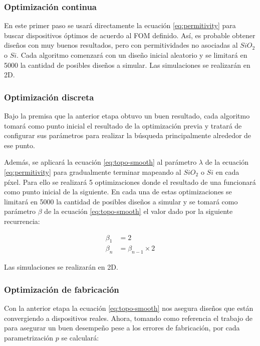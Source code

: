 \subsubsection{Optimización continua}

En este primer paso se usará directamente la ecuación \ref{eq:permitivity} para buscar dispositivos óptimos de acuerdo al FOM definido.
Así, es probable obtener diseños con muy buenos resultados, pero con permitividades no asociadas al $SiO_2$ o $Si$.
Cada algoritmo comenzará con un diseño inicial aleatorio y se limitará en 5000 la cantidad de posibles diseños a simular. 
Las simulaciones se realizarán en 2D.

\subsubsection{Optimización discreta}

Bajo la premisa que la anterior etapa obtuvo un buen resultado, cada algoritmo tomará como punto inicial el resultado de la optimización previa y tratará de configurar sus parámetros para realizar la búsqueda principalmente alrededor de ese punto.

Además, se aplicará la ecuación \ref{eq:topo-smooth} al parámetro $\lambda$ de la ecuación \ref{eq:permitivity} para gradualmente terminar mapeando al $SiO_2$ o $Si$ en cada píxel. 
Para ello se realizará 5 optimizaciones donde el resultado de una funcionará como punto inicial de la siguiente.
En cada una de estas optimizaciones se limitará en 5000 la cantidad de posibles diseños a simular y se tomará como parámetro $\beta$ de la ecuación \ref{eq:topo-smooth} el valor dado por la siguiente recurrencia:

\begin{equation}
  \begin{split}
    \beta_1 &= 2\\
    \beta_n &= \beta_{n-1} \times 2
  \end{split}
  \label{eq:beta-param}
\end{equation}

Las simulaciones se realizarán en 2D.

\subsubsection{Optimización de fabricación}

Con la anterior etapa la ecuación \ref{eq:topo-smooth} nos asegura diseños que están convergiendo a dispositivos reales.
Ahora, tomando como referencia el trabajo de \cite{Hammond20} para asegurar un buen desempeño pese a los errores de fabricación, por cada parametrización $p$ se calculará:

